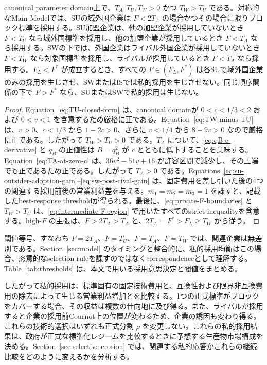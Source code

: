 \begin{lemma}[私的採用の誘因と関連閾値]
\label{lem:private-adoption}
canonical parameter domain上で、$T_A,T_U,T_W>0$ かつ $T_W>T_U$ である。対称的なMain Modelでは、SUの域外国企業は $F<2T_A$ の場合かつその場合に限りブロック標準を採用する。SU加盟企業は、他の加盟企業が採用していないとき $F<T_U$ なら域外国標準を採用し、他の加盟企業が採用しているとき $F<T_A$ なら採用する。SWの下では、外国企業はライバル外国企業が採用していないとき $F<T_W$ なら対象国標準を採用し、ライバルが採用しているとき $F<T_A$ なら採用する。$F_L<F^\ast$ が成立するとき、すべての $F\in(F_L,F^\ast)$ は各SUで域外国企業のみの採用を生じさせ、SWまたはISでは私的採用を生じさせない。同じ順序関係の下で $F>F^\ast$ なら、SUまたはSWで私的採用は生じない。
\end{lemma}

\begin{proof}
Equation~\eqref{eq:TU-closed-form} は、canonical domainが $0<c<1/3<2$ および $0<v<1$ を含意するため厳格に正である。Equation~\eqref{eq:TW-minus-TU} は、$v>0$、$c<1/3$ から $1-2c>0$、さらに $v<1/4$ から $8-9v>0$ なので厳格に正である。したがって $T_W>T_U>0$ である。$T_A$ について、\eqref{eq:qB-c-derivative} と $q_B$ の正値性は $B=q_B^2$ が $c$ とともに低下することを意味する。Equation~\eqref{eq:TA-at-zero-c} は、$36v^2-51v+16$ が許容区間で減少し、その上端でも正であるため正である。したがって $T_A>0$ である。Equations~\eqref{eq:su-outsider-adoption-gain}--\eqref{eq:sw-post-rival-gain} は、固定費用を差し引いた後の4つの関連する採用前後の営業利益差を与える。$m_1=m_2=m_3=1$ を課すと、記載したbest-response thresholdが得られる。最後に、\eqref{eq:private-F-boundaries} と $T_W>T_U$ は、\eqref{eq:intermediate-F-region} で用いたすべてのstrict inequalityを含意する。high-$F$ の主張は、$F>2T_A>T_A$ と、$2T_A=F^\ast>F_L\ge T_W$ から従う。
\end{proof}

閾値等号、すなわち $F=2T_A$、$F=T_U$、$F=T_A$、$F=T_W$ では、関連企業は無差別である。Section~\ref{sec:model} のタイミングと整合的に、私的採用均衡はこの場合、恣意的なselection ruleを課すのではなくcorrespondenceとして理解する。Table~\ref{tab:thresholds} は、本文で用いる採用意思決定と閾値をまとめる。



したがって私的採用は、標準固有の固定技術費用と、互換性および限界非互換費用の除去によって生じる営業利益増加とを比較する。1つの正式標準がブロックをカバーする場合、その収益は複数の仕向地に及び得る。また、ライバルが採用すると企業の採用前Cournot上の位置が変わるため、企業の誘因も変わり得る。これらの技術的選択はいずれも正式分割 $\rho$ を変更しない。これらの私的採用結果は、政府が正式な標準化レジームを比較するときに予想する生産物市場構成を決める。Section~\ref{sec:selective-erosion} では、関連する私的応答がこれらの継続比較をどのように変えるかを分析する。
